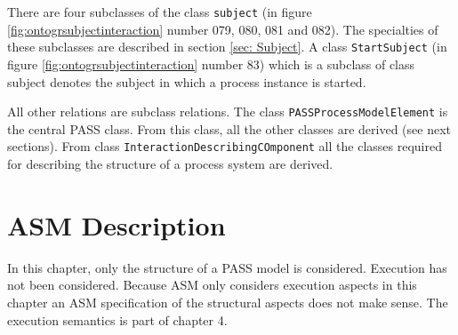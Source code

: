 There are four subclasses of the class \texttt{subject} (in figure \ref{fig:ontogrsubjectinteraction} number 079, 080, 081 and 082). The specialties of these subclasses are described in section \ref{sec: Subject}. A class \texttt{StartSubject} (in figure \ref{fig:ontogrsubjectinteraction} number 83) which is a subclass of class subject denotes the subject in which a process instance is started.

All other relations are subclass relations. The class \texttt{PASSProcessModelElement} is the central PASS class. From this class, all the other classes are derived (see next sections). From class \texttt{InteractionDescribingCOmponent} all the classes required for describing the structure of a process system are derived.

\section{ASM Description}

In this chapter, only the structure of a PASS model is considered. Execution has not been considered. Because ASM only considers execution aspects in this chapter an ASM specification of the structural aspects does not make sense. The execution semantics is part of chapter 4.
